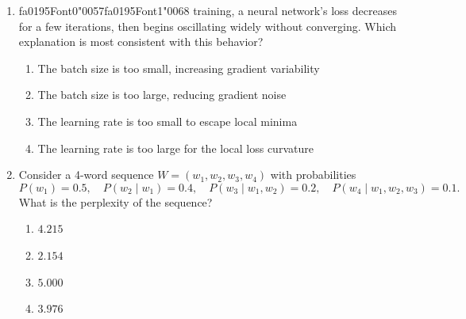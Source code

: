 \documentclass[12pt]{article}
\begin{document}
\begin{enumerate}[label=Q\arabic*.]
{\csname fa0194Font0\endcsname\char"0064}{\csname fa0194Font1\endcsname\char"0061}{\csname fa0194Font2\endcsname\char"0074}{\csname fa0194Font3\endcsname\char"0061}{\csname fa0194Font4\endcsname\char"003F}
 \begin{enumerate}[label=(\Alph*)]
     \item Lower perplexity always indicates overfitting to training data
     \item Perplexity ignores normalization across token positions
     \item Question answering requires larger vocabularies than modeling
     \item Perplexity reflects intrinsic likelihood rather than task utility
 \end{enumerate}
 
 \item {\csname fa0195Font0\endcsname\char"0057}{\csname fa0195Font1\endcsname\char"0068} training, a neural network's loss decreases for a few iterations, then begins oscillating widely without converging. Which explanation is most consistent with this behavior?
 \begin{enumerate}[label=(\Alph*)]
     \item The batch size is too small, increasing gradient variability
     \item The batch size is too large, reducing gradient noise
     \item The learning rate is too small to escape local minima
     \item The learning rate is too large for the local loss curvature
 \end{enumerate}
 
 \item Consider a 4-word sequence $W = (w_1, w_2, w_3, w_4)$ with probabilities
 \[
 P(w_1) = 0.5,\quad
 P(w_2 \mid w_1) = 0.4,\quad
 P(w_3 \mid w_1, w_2) = 0.2,\quad
 P(w_4 \mid w_1, w_2, w_3) = 0.1.
 \]
 What is the perplexity of the sequence?
 \begin{enumerate}[label=(\Alph*)]
     \item $4.215$
     \item $2.154$
     \item $5.000$
     \item $3.976$
 \end{enumerate}
 

\end{enumerate}
\end{document}
